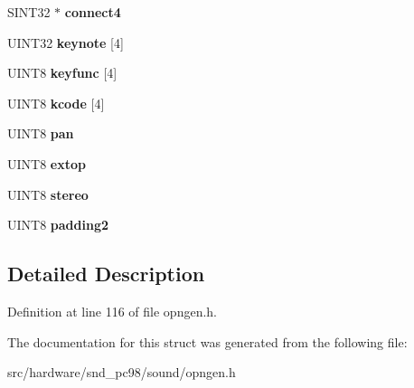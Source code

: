 \begin{DoxyCompactItemize}
\item 
\hypertarget{structOPNCH_a6799b34728d3d03db8d060648478c7d8}{S\-I\-N\-T32 $\ast$ {\bfseries connect4}}\label{structOPNCH_a6799b34728d3d03db8d060648478c7d8}

\item 
\hypertarget{structOPNCH_a3a8c0a83a5b8a840ad587ffacc822ee4}{U\-I\-N\-T32 {\bfseries keynote} \mbox{[}4\mbox{]}}\label{structOPNCH_a3a8c0a83a5b8a840ad587ffacc822ee4}

\item 
\hypertarget{structOPNCH_a06193c0869aa5105301ae33763bae070}{U\-I\-N\-T8 {\bfseries keyfunc} \mbox{[}4\mbox{]}}\label{structOPNCH_a06193c0869aa5105301ae33763bae070}

\item 
\hypertarget{structOPNCH_a0b3b1220494b8f9e1b5fb136efb238e1}{U\-I\-N\-T8 {\bfseries kcode} \mbox{[}4\mbox{]}}\label{structOPNCH_a0b3b1220494b8f9e1b5fb136efb238e1}

\item 
\hypertarget{structOPNCH_a00eacd912f533905d00e033160d88b16}{U\-I\-N\-T8 {\bfseries pan}}\label{structOPNCH_a00eacd912f533905d00e033160d88b16}

\item 
\hypertarget{structOPNCH_a6e40b8422c6867f4dc5d85816e317f5b}{U\-I\-N\-T8 {\bfseries extop}}\label{structOPNCH_a6e40b8422c6867f4dc5d85816e317f5b}

\item 
\hypertarget{structOPNCH_a8581a9cc9479b6e7dbc9e4163522252e}{U\-I\-N\-T8 {\bfseries stereo}}\label{structOPNCH_a8581a9cc9479b6e7dbc9e4163522252e}

\item 
\hypertarget{structOPNCH_aa9c335f958d4ed5d2172eddc7d2d0a6f}{U\-I\-N\-T8 {\bfseries padding2}}\label{structOPNCH_aa9c335f958d4ed5d2172eddc7d2d0a6f}

\end{DoxyCompactItemize}


\subsection{Detailed Description}


Definition at line 116 of file opngen.\-h.



The documentation for this struct was generated from the following file\-:\begin{DoxyCompactItemize}
\item 
src/hardware/snd\-\_\-pc98/sound/opngen.\-h\end{DoxyCompactItemize}
